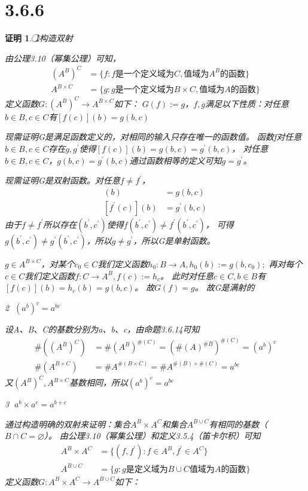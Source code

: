 \documentclass{article}
\theoremstyle{mystyle}
\theoremstyle{zproofstyle}
\newtheorem*{zproof}{证明}
\begin{document}
\section*{3.6.6}
\begin{zproof}
  \textcircled{1}构造双射

  由公理3.10（幂集公理）可知，
  \begin{align}
    (A^B)^C &= \{f: f\text{是一个定义域为}C,\text{值域为}A^B\text{的函数}\} \\
    A^{B \times C} &= \{g: g\text{是一个定义域为}B \times C,\text{值域为}A\text{的函数}\} 
  \end{align}
    定义函数$G: (A^B)^C \rightarrow A^{B \times C}$如下： 
    $G(f):=g$，$f,g$满足以下性质：对任意$b \in B, c \in C$有$[f(c)](b)=g(b,c)$

    现需证明G是满足函数定义的，对相同的输入只存在唯一的函数值。
    函数f对任意$b \in B, c \in C$存在$g, g^\prime$使得$[f(c)](b)=g(b,c)=g^\prime(b,c)$，
    对任意$b \in B, c \in C$，$g(b,c)=g^\prime(b,c)$通过函数相等的定义可知$g=g^\prime$。

    现需证明G是双射函数。对任意$f \neq f^\prime$， 
    \begin{align}
      [f(c)](b) &= g(b,c)  \\
      [f^\prime(c)](b) &= g^\prime(b,c) 
    \end{align}
    由于$f \neq f^\prime$所以存在$(b^\prime, c^\prime)$使得$f(b^\prime, c^\prime) \neq f^\prime(b^\prime, c^\prime)$，
    可得$g(b^\prime, c^\prime) \neq g^\prime(b^\prime, c^\prime)$，所以$g \neq g^\prime$，所以G是单射函数。

    $g \in A^{B \times C}$，对某个$c_0\in C$我们定义函数$h_0: B\rightarrow A, h_0(b):=g(b, c_0);$
    再对每个$c\in C$我们定义函数$f: C\rightarrow A^B, f(c):=h_c$。 
    此时对任意$c\in C,b\in B$有$[f(c)](b)=h_c(b)=g(b,c)$。 故$G(f)=g$。 故G是满射的

    \textcircled{2} $(a^b)^c = a^{bc}$

    设A、B、C的基数分别为a、b、c，由命题3.6.14可知
    \begin{align}
      \#((A^B)^C) &= \#(A^B)^{\#(C)} = (\#(A)^{\#B})^{\#(C)} = (a^b)^c \\
      \#(A^{B \times C}) &= \#A^{\#(B \times C)} = \#A^{\#(B) \times \#(C)} = a^{bc}
    \end{align}
    又$(A^B)^C,A^{B \times C}$基数相同，所以$(a^b)^c = a^{bc}$

    \textcircled{3} $a^b \times a^c = a^{b+c}$

    通过构造明确的双射来证明：集合$A^B \times A^C$和集合$A^{B \cup C}$有相同的基数（$B \cap C = \varnothing$）。
    由公理3.10（幂集公理）和定义3.5.4（笛卡尔积）可知
    \begin{align}
      A^B \times A^C &= \{(f, f^\prime): f \in A^B, f^\prime \in A^C\} \\ 
      A^{B \cup C} &= \{g: g\text{是定义域为}B \cup C \text{值域为} A \text{的函数} \}
    \end{align}
    定义函数$G: A^B \times A^C \rightarrow A^{B \cup C}$如下：


\end{zproof}
\end{document}
